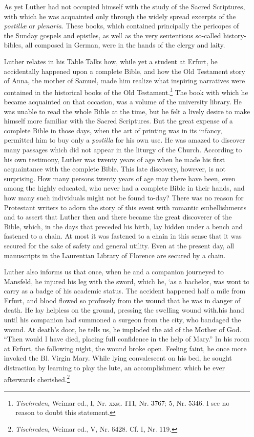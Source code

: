 As yet Luther had not occupied himself with the study of the
Sacred Scriptures, with which he was acquainted only through the
widely spread excerpts of the \textit{postillæ} or \textit{plenaria}. These books, which
contained principally the pericopes of the Sunday gospels and epistles, as well as the very sententious so-called history-bibles, all composed in German, were in the hands of the clergy and laity.

Luther relates in his Table Talks how, while yet a student at Erfurt,
he accidentally happened upon a complete Bible, and how the
Old Testament story of Anna, the mother of Samuel, made him
realize what inspiring narratives were contained in the historical
books of the Old Testament.\footnote{\textit{Tischreden}, Weimar ed., I, Nr. xxs;. ITI, Nr. 3767; 5, Nr. 5346. I see no reason to doubt this statement.}
The book with which he became acquainted on that occasion, was a volume of the university library.
He was unable to read the whole Bible at the time, but he felt a lively
desire to make himself more familiar with the Sacred Scriptures.
But the great expense of a complete Bible in those days, when the
art of printing was in its infancy, permitted him to buy only a
\textit{postilla} for his own use. He was amazed to discover many passages
which did not appear in the liturgy of the Church. According to
his own testimony, Luther was twenty years of age when he made
his first acquaintance with the complete Bible. This late discovery,
however, is not surprising. How many persons twenty years of age
may there have been, even among the highly educated, who never
had a complete Bible in their hands, and how many such individuals
might not be found to-day? There was no reason for Protestant
writers to adorn the story of this event with romantic embellishments
and to assert that Luther then and there became the great
discoverer of the Bible, which, in the days that preceded his birth,
lay hidden under a bench and fastened to a chain. At most it was
fastened to a chain in this sense that it was secured for the sake
of safety and general utility. Even at the present day, all manuscripts
in the Laurentian Library of Florence are secured by a chain.

Luther also informs us that once, when he and a companion
journeyed to Mansfeld, he injured his leg with the sword, which he,
‘as a bachelor, was wont to carry as a badge of his academic
status. The accident happened half a mile from Erfurt, and blood
flowed so profusely from the wound that he was in danger of death.
He lay helpless on the ground, pressing the swelling wound with.his
hand until his companion had summoned a surgeon from the city,
who bandaged the wound. At death’s door, he tells us, he imploded
the aid of the Mother of God. “Then would I have died, placing
full confidence in the help of Mary.” In his room at Erfurt, the following
night, the wound broke open. Feeling faint, he once more
invoked the Bl. Virgin Mary. While lying convalescent on his bed,
he sought distraction by learning to play the lute, an accomplishment which he ever afterwards cherished.\footnote{\textit{Tischreden}, Weimar ed., V, Nr. 6428. Cf. I, Nr. 119.}

